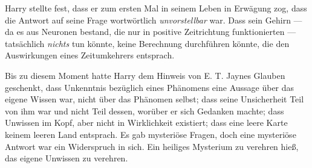 Harry stellte fest, dass er zum ersten Mal in seinem Leben in Erwägung zog, dass die Antwort auf seine Frage wortwörtlich \emph{unvorstellbar} war. Dass sein Gehirn — da es aus Neuronen bestand, die nur in positive Zeitrichtung funktionierten — tatsächlich \emph{nichts} tun könnte, keine Berechnung durchführen könnte, die den Auswirkungen eines Zeitumkehrers entsprach.

Bis zu diesem Moment hatte Harry dem Hinweis von E. T. Jaynes Glauben geschenkt, dass Unkenntnis bezüglich eines Phänomens eine Aussage über das eigene Wissen war, nicht über das Phänomen selbst; dass seine Unsicherheit Teil von ihm war und nicht Teil dessen, worüber er sich Gedanken machte; dass Unwissen im Kopf, aber nicht in Wirklichkeit existiert; dass eine leere Karte keinem leeren Land entsprach. Es gab mysteriöse Fragen, doch eine mysteriöse Antwort war ein Widerspruch in sich. Ein heiliges Mysterium zu verehren hieß, das eigene Unwissen zu verehren.

